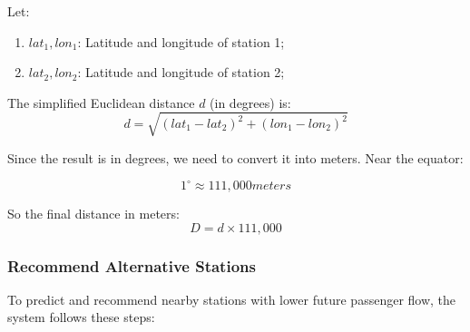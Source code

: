 \documentclass[11pt]{article} %
\begin{document}
Let:
\begin{enumerate}
\item  $lat_1, lon_1$: Latitude and longitude of station 1;
\item  $lat_2, lon_2$: Latitude and longitude of station 2;
\end{enumerate}

The simplified Euclidean distance $d$ (in degrees) is:
\begin{equation}
	d = \sqrt{( lat_1 - lat_2 )^2 + ( lon_1 - lon_2 )^2}
\end{equation}

Since the result is in degrees, we need to convert it into meters. Near the equator:

\begin{equation}
	1^\circ \approx 111{,}000 meters 
\end{equation}

So the final distance in meters:
 \begin{equation}
 	D = d \times 111{,}000
 \end{equation}
 
\subsubsection{Recommend Alternative Stations}
To predict and recommend nearby stations with lower future passenger flow, the system follows these steps:
\end{document}
